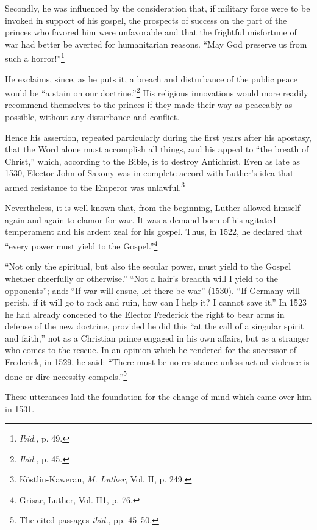 Secondly, he was influenced by the consideration that, if military
force were to be invoked in support of his gospel, the prospects of
success on the part of the princes who favored him were unfavorable
and that the frightful misfortune of war had better be averted for
humanitarian reasons. “May God preserve us from such a horror!”\footnote{\textit{Ibid.}, p. 49.}

He exclaims, since, as he puts it, a breach and disturbance of the
public peace would be “a stain on our doctrine.”\footnote{\textit{Ibid.}, p. 45.}
His religious
innovations would more readily recommend themselves to the princes
if they made their way as peaceably as possible, without any disturbance
and conflict.

Hence his assertion, repeated particularly during the first years
after his apostasy, that the Word alone must accomplish all
things, and his appeal to “the breath of Christ,” which, according to
the Bible, is to destroy Antichrist. Even as late as 1530, Elector John
of Saxony was in complete accord with Luther’s idea that armed resistance
to the Emperor was unlawful.\footnote{Köstlin-Kawerau, \textit{M. Luther}, Vol. II, p. 249.}


Nevertheless, it is well known that, from the beginning, Luther
allowed himself again and again to clamor for war. It was a demand
born of his agitated temperament and his ardent zeal for his gospel.
Thus, in 1522, he declared that “every power must yield to the Gospel.”\footnote{Grisar, Luther, Vol. II1, p. 76.}

“Not only the spiritual, but also the secular power, must yield
to the Gospel whether cheerfully or otherwise.” “Not a hair’s breadth
will I yield to the opponents”; and: “If war will ensue, let there be
war” (1530). “If Germany will perish, if it will go to rack and
ruin, how can I help it? I cannot save it.” In 1523 he had already
conceded to the Elector Frederick the right to bear arms in defense
of the new doctrine, provided he did this “at the call of a singular
spirit and faith,” not as a Christian prince engaged in his own affairs,
but as a stranger who comes to the rescue. In an opinion which he rendered
for the successor of Frederick, in 1529, he said: “There must be
no resistance unless actual violence is done or dire necessity compels.”\footnote{The cited passages \textit{ibid.}, pp. 45--50.}


These utterances laid the foundation for the change of mind which
came over him in 1531.

